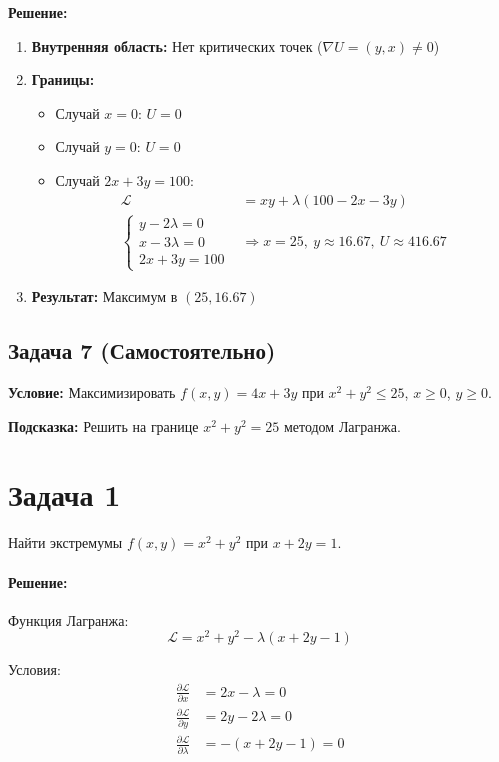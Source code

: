 \documentclass{article}
\begin{document}
\textbf{Решение:}
\begin{enumerate}
\item \textbf{Внутренняя область:} Нет критических точек (\(\nabla U = (y,x) \neq 0\))

\item \textbf{Границы:}
\begin{itemize}
\item Случай \(x=0\): \(U=0\)
\item Случай \(y=0\): \(U=0\)
\item Случай \(2x + 3y = 100\):
\begin{align*}
\mathcal{L} &= xy + \lambda(100 - 2x - 3y) \\
\begin{cases}
y - 2\lambda = 0 \\
x - 3\lambda = 0 \\
2x + 3y = 100
\end{cases} 
&\Rightarrow x = 25,\ y \approx 16.67,\ U \approx 416.67
\end{align*}
\end{itemize}

\item \textbf{Результат:} Максимум в \((25, 16.67)\)
\end{enumerate}

\subsection*{Задача 7 (Самостоятельно)}
\textbf{Условие:} Максимизировать \(f(x,y) = 4x + 3y\) при \(x^2 + y^2 \leq 25\), \(x \geq 0\), \(y \geq 0\).

\textbf{Подсказка:} Решить на границе \(x^2 + y^2 = 25\) методом Лагранжа.


\section*{Задача 1}
Найти экстремумы $f(x, y) = x^2 + y^2$ при $x + 2y = 1$.

\paragraph*{Решение:}
Функция Лагранжа:
\[
\mathcal{L} = x^2 + y^2 - \lambda(x + 2y - 1)
\]

Условия:
\begin{align*}
\frac{\partial \mathcal{L}}{\partial x} &= 2x - \lambda = 0 \\
\frac{\partial \mathcal{L}}{\partial y} &= 2y - 2\lambda = 0 \\
\frac{\partial \mathcal{L}}{\partial \lambda} &= -(x + 2y - 1) = 0
\end{align*}
\end{document}
